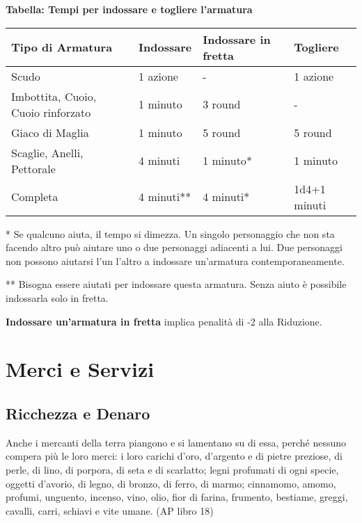 \documentclass[12pt,a4paper,twoside,openany]{book}
\begin{document}
\textbf{Tabella: Tempi per indossare e togliere l'armatura}

\begin{tabular}{llll}
\textbf{Tipo di Armatura}& \textbf{Indossare} & \textbf{Indossare in fretta} & \textbf{Togliere}\\
\toprule
Scudo& 1 azione & - & 1 azione\\
Imbottita, Cuoio, Cuoio rinforzato  & 1 minuto& 3 round  & - \\
Giaco di Maglia& 1 minuto& 5 round  & 5 round\\
Scaglie, Anelli, Pettorale& 4 minuti & 1 minuto{*}  & 1 minuto\\
Completa  & 4 minuti{*}{*}& 4 minuti{*}& 1d4+1 minuti\\
\end{tabular}

\bigskip

\begin{multicols}{2}

{*} Se qualcuno aiuta, il tempo si dimezza. Un singolo personaggio che non sta facendo altro può aiutare uno o due personaggi adiacenti a lui. Due personaggi non possono aiutarsi l'un l'altro a indossare un'armatura contemporaneamente.

{*}{*} Bisogna essere aiutati per indossare questa armatura. Senza aiuto è possibile indossarla solo in fretta.

\textbf{Indossare un'armatura in fretta} implica penalità di -2 alla Riduzione.


\end{multicols}

\pagebreak

\section{Merci e Servizi}


\subsection{Ricchezza e Denaro}


\begin{changemargin}{0.3cm}{0.3cm}\begin{enfasi}{
Anche i mercanti della terra piangono e si lamentano su di essa, perché nessuno compera più le loro merci: i loro carichi d’oro, d’argento e di pietre preziose, di perle, di lino, di porpora, di seta e di scarlatto; legni profumati di ogni specie, oggetti d’avorio, di legno, di bronzo, di ferro, di marmo; cinnamomo, amomo, profumi, unguento, incenso, vino, olio, fior di farina, frumento, bestiame, greggi, cavalli, carri, schiavi e vite umane. (AP libro 18)
}
\end{enfasi}\end{changemargin}\medskip
\end{document}
